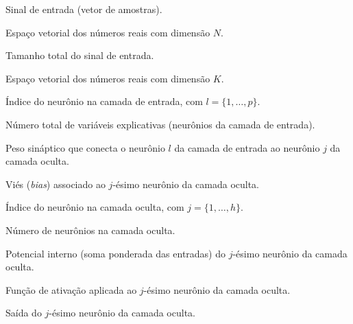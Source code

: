 \documentclass[
	12pt,				%
	oneside,
	a4paper,			%
	english,			%
	french,				%
	spanish,			%
	brazil				%
	]{abntex2}
\begin{document}
\begin{simbolos}
\item[\textbf{$x$}] Sinal de entrada (vetor de amostras).
\item[\textbf{$\mathbb{R}^{N}$}] Espaço vetorial dos números reais com dimensão $N$.
\item[\textbf{$N$}] Tamanho total do sinal de entrada.
\item[\textbf{$\mathbb{R}^{K}$}] Espaço vetorial dos números reais com dimensão $K$.
\item[\textbf{$l$}] Índice do neurônio na camada de entrada, com $l = \{1,\ldots,p\}$.
\item[\textbf{$p$}] Número total de variáveis explicativas (neurônios da camada de entrada).
\item[\textbf{$\omega^{h}_{j,l}$}] Peso sináptico que conecta o neurônio $l$ da camada de entrada ao neurônio $j$ da camada oculta.
\item[\textbf{$\theta^{h}_{j}$}] Viés (\textit{bias}) associado ao $j$-ésimo neurônio da camada oculta.
\item[\textbf{$j$}] Índice do neurônio na camada oculta, com $j = \{1,\ldots,h\}$.
\item[\textbf{$h$}] Número de neurônios na camada oculta.
\item[\textbf{$\mathrm{rede}^{h}_{j}$}] Potencial interno (soma ponderada das entradas) do $j$-ésimo neurônio da camada oculta.
\item[\textbf{$f^{h}_{j}(\cdot)$}] Função de ativação aplicada ao $j$-ésimo neurônio da camada oculta.
\item[\textbf{$f^{h}_{j}(\mathrm{rede}^{h}_{j})$}] Saída do $j$-ésimo neurônio da camada oculta.

\end{simbolos}
\end{document}
